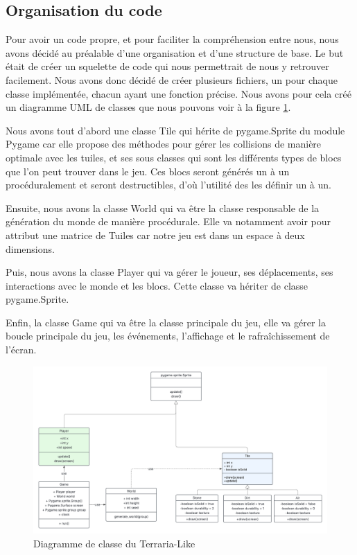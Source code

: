 \documentclass{article}
\begin{document}
\subsection{Organisation du code}
Pour avoir un code propre, et pour faciliter la compréhension entre nous, nous avons décidé au préalable d'une organisation et d'une structure de base. Le but était de créer un squelette de code qui nous permettrait de nous y retrouver facilement. Nous avons donc décidé de créer plusieurs fichiers, un pour chaque classe implémentée, chacun ayant une fonction précise. Nous avons pour cela créé un diagramme UML de classes que nous pouvons voir à la figure \ref{UML_class}.\par
Nous avons tout d'abord une classe Tile qui hérite de pygame.Sprite du module Pygame car elle propose des méthodes pour gérer les collisions de manière optimale avec les tuiles, et ses sous classes qui sont les différents types de blocs que l'on peut trouver dans le jeu. Ces blocs seront générés un à un procéduralement et seront destructibles, d'où l'utilité des les définir un à un.\par
Ensuite, nous avons la classe World qui va être la classe responsable de la génération du monde de manière procédurale. Elle va notamment avoir pour attribut une matrice de Tuiles car notre jeu est dans un espace à deux dimensions.\par
Puis, nous avons la classe Player qui va gérer le joueur, ses déplacements, ses interactions avec le monde et les blocs. Cette classe va hériter de classe pygame.Sprite.\par
Enfin, la classe Game qui va être la classe principale du jeu, elle va gérer la boucle principale du jeu, les événements, l'affichage et le rafraîchissement de l'écran.\par
\begin{figure}[!h]
  \centering
  \includegraphics[width=\textwidth]{assets/UML_class.png}
  \caption{Diagramme de classe du Terraria-Like}
  \label{UML_class}
\end{figure}
\end{document}
